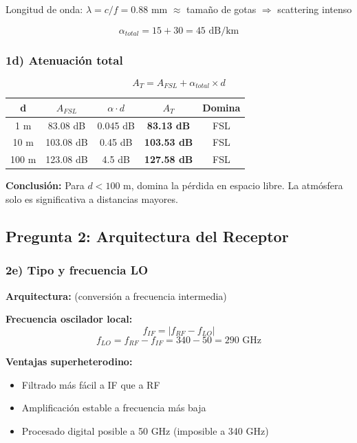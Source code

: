 \documentclass[a4paper,10pt]{article}
\begin{document}
Longitud de onda: $\lambda = c/f = 0.88$ mm $\approx$ tamaño de gotas $\Rightarrow$ scattering intenso

$$\boxed{\alpha_{total} = 15 + 30 = 45 \text{ dB/km}}$$

\subsubsection{1d) Atenuación total}

$$A_T = A_{FSL} + \alpha_{total} \times d$$

\begin{center}
\begin{tabular}{ccccc}
\toprule
\textbf{d} & \textbf{$A_{FSL}$} & \textbf{$\alpha \cdot d$} & \textbf{$A_T$} & \textbf{Domina} \\
\midrule
1 m & 83.08 dB & 0.045 dB & \textbf{83.13 dB} & FSL \\
10 m & 103.08 dB & 0.45 dB & \textbf{103.53 dB} & FSL \\
100 m & 123.08 dB & 4.5 dB & \textbf{127.58 dB} & FSL \\
\bottomrule
\end{tabular}
\end{center}

\textbf{Conclusión:} Para $d < 100$ m, domina la pérdida en espacio libre. La atmósfera solo es significativa a distancias mayores.

\subsection{Pregunta 2: Arquitectura del Receptor}

\subsubsection{2e) Tipo y frecuencia LO}

\textbf{Arquitectura:}  (conversión a frecuencia intermedia)

\textbf{Frecuencia oscilador local:}
$$f_{IF} = |f_{RF} - f_{LO}|$$
$$f_{LO} = f_{RF} - f_{IF} = 340 - 50 = \boxed{290 \text{ GHz}}$$

\textbf{Ventajas superheterodino:}
\begin{itemize}
    \item Filtrado más fácil a IF que a RF
    \item Amplificación estable a frecuencia más baja
    \item Procesado digital posible a 50 GHz (imposible a 340 GHz)
\end{itemize}
\end{document}
